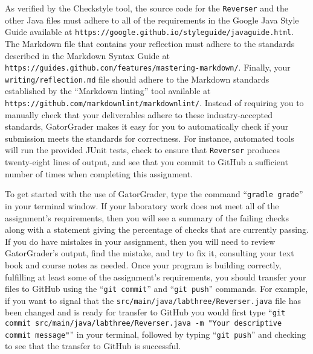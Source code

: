 \documentclass[11pt]{article}
\newcommand{\mainprogram}{\lstinline{Reverser}}
\newcommand{\mainprogramsource}{\lstinline{src/main/java/labthree/Reverser.java}}
\newcommand{\mainprogramoutput}{twenty-eight}
\newcommand{\reflection}{\lstinline{writing/reflection.md}}
\newcommand{\gatorgraderstart}{\command{gradle grade}}
\newcommand{\gitcommit}{\command{git commit}}
\newcommand{\gitpush}{\command{git push}}
\newcommand{\gitcommitmainprogram}{\command{git commit src/main/java/labthree/Reverser.java -m "Your
descriptive commit message"}}
\newcommand{\command}[1]{``\lstinline{#1}''}
\newcommand{\url}[1]{\lstinline{#1}}
\newcommand{\step}[1]{``{#1}''}
\begin{document}
As verified by the Checkstyle tool, the source code for the \mainprogram{} and
the other Java files must adhere to all of the requirements in the Google Java
Style Guide available at
\url{https://google.github.io/styleguide/javaguide.html}. The Markdown file that
contains your reflection must adhere to the standards described in the Markdown
Syntax Guide at \url{https://guides.github.com/features/mastering-markdown/}.
Finally, your \reflection{} file should adhere to the Markdown standards
established by the \step{Markdown linting} tool available at
\url{https://github.com/markdownlint/markdownlint/}. Instead of requiring you to
manually check that your deliverables adhere to these industry-accepted
standards, GatorGrader makes it easy for you to automatically check if your
submission meets the standards for correctness. For instance, automated tools
will run the provided JUnit tests, check to ensure that \mainprogram{} produces
\mainprogramoutput{} lines of output, and see that you commit to GitHub a
sufficient number of times when completing this assignment.

To get started with the use of GatorGrader, type the command
\gatorgraderstart{} in your terminal window. If your laboratory work does not
meet all of the assignment's requirements, then you will see a summary of the
failing checks along with a statement giving the percentage of checks that are
currently passing. If you do have mistakes in your assignment, then you will
need to review GatorGrader's output, find the mistake, and try to fix it,
consulting your text book and course notes as needed. Once your program is
building correctly, fulfilling at least some of the assignment's requirements,
you should transfer your files to GitHub using the \gitcommit{} and \gitpush{}
commands. For example, if you want to signal that the \mainprogramsource{} file
has been changed and is ready for transfer to GitHub you would first type
\gitcommitmainprogram{} in your terminal, followed by typing \gitpush{} and
checking to see that the transfer to GitHub is successful.
\end{document}

